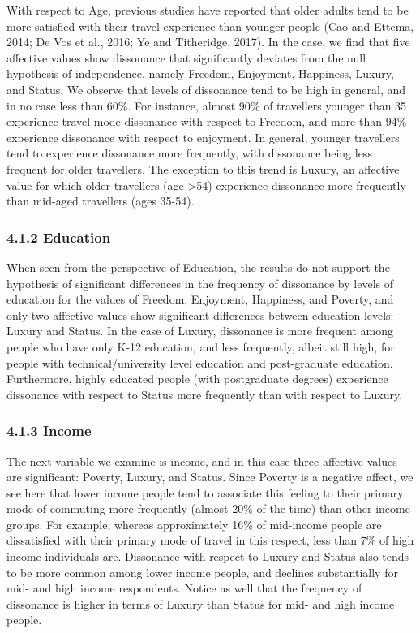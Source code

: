 \documentclass[]{elsarticle} %
\begin{document}
With respect to Age, previous studies have reported that older adults
tend to be more satisfied with their travel experience than younger
people (Cao and Ettema, 2014; De Vos et al., 2016; Ye and Titheridge,
2017). In the case, we find that five affective values show dissonance
that significantly deviates from the null hypothesis of independence,
namely Freedom, Enjoyment, Happiness, Luxury, and Status. We observe
that levels of dissonance tend to be high in general, and in no case
less than 60\%. For instance, almost 90\% of travellers younger than 35
experience travel mode dissonance with respect to Freedom, and more than
94\% experience dissonance with respect to enjoyment. In general,
younger travellers tend to experience dissonance more frequently, with
dissonance being less frequent for older travellers. The exception to
this trend is Luxury, an affective value for which older travellers (age
\textgreater54) experience dissonance more frequently than mid-aged
travellers (ages 35-54).

\hypertarget{education}{%
\subsubsection{4.1.2 Education}\label{education}}

When seen from the perspective of Education, the results do not support
the hypothesis of significant differences in the frequency of dissonance
by levels of education for the values of Freedom, Enjoyment, Happiness,
and Poverty, and only two affective values show significant differences
between education levels: Luxury and Status. In the case of Luxury,
dissonance is more frequent among people who have only K-12 education,
and less frequently, albeit still high, for people with
technical/university level education and post-graduate education.
Furthermore, highly educated people (with postgraduate degrees)
experience dissonance with respect to Status more frequently than with
respect to Luxury.

\hypertarget{income}{%
\subsubsection{4.1.3 Income}\label{income}}

The next variable we examine is income, and in this case three affective
values are significant: Poverty, Luxury, and Status. Since Poverty is a
negative affect, we see here that lower income people tend to associate
this feeling to their primary mode of commuting more frequently (almost
20\% of the time) than other income groups. For example, whereas
approximately 16\% of mid-income people are dissatisfied with their
primary mode of travel in this respect, less than 7\% of high income
individuals are. Dissonance with respect to Luxury and Status also tends
to be more common among lower income people, and declines substantially
for mid- and high income respondents. Notice as well that the frequency
of dissonance is higher in terms of Luxury than Status for mid- and high
income people.
\end{document}
